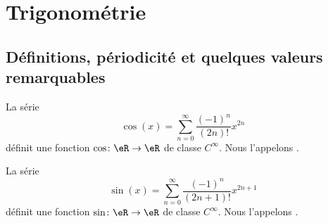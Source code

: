 
\section{Trigonométrie}

\subsection{Définitions, périodicité et quelques valeurs remarquables}

\begin{propositionDef}       \label{PROPooZXPVooBjONka}
	La série
	\begin{equation}
		\cos(x)=\sum_{n=0}^{\infty}\frac{ (-1)^n }{ (2n)! }x^{2n}
	\end{equation}
	définit une fonction \( \cos\colon \eR\to \eR\) de classe \(  C^{\infty}\). Nous l'appelons .

	La série
	\begin{equation}        \label{EQooCMRFooCTtpge}
		\sin(x)=\sum_{n=0}^{\infty}\frac{ (-1)^n }{ (2n+1)! }x^{2n+1}
	\end{equation}
	définit une fonction \( \sin\colon \eR\to \eR\) de classe \(  C^{\infty}\). Nous l'appelons .
\end{propositionDef}

